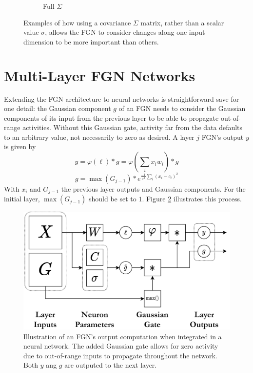 \documentclass[12pt,oneside]{CUNY_PhD}
\begin{document}
\begin{figure}[!t]
\begin{subfigure}[t]{0.49\textwidth}
        \caption*{Full $\Sigma$}
    \end{subfigure}
    \caption{Examples of how using a covariance $\Sigma$ matrix, rather than a scalar value $\sigma$, allows the FGN to consider changes along one input dimension to be more important than others.}
    \label{fig:covars}
\end{figure}

\section{Multi-Layer FGN Networks}
Extending the FGN architecture to neural networks is straightforward save for one detail: the Gaussian component $g$ of an FGN needs to consider the Gaussian components of its input from the previous layer to be able to propagate out-of-range activities. Without this Gaussian gate, activity far from the data defaults to an arbitrary value, not necessarily to zero as desired. A layer $j$ FGN's output $y$ is given by
\[y =  \varphi(\ell)*g = \varphi(\sum_i x_{i} w_{i}) * g\]
\[g = \max(G_{j-1}) * e^{\frac{-1}{\sigma^2}\sum_{i}(x_i-c_i)^2}\]
With $x_{i}$ and $G_{j-1}$ the previous layer outputs and Gaussian components. For the initial layer, $\max(G_{j-1})$ should be set to $1$. Figure \ref{fig:fgn-layer} illustrates this process.
\begin{figure}[!t]
    \centering
        \includegraphics[width=\textwidth]{images/multi-layer-fgn/FGN-Network.png}
    \caption{Illustration of an FGN's output computation when integrated in a neural network. The added Gaussian gate allows for zero activity due to out-of-range inputs to propagate throughout the network. Both $y$ ang $g$ are outputed to the next layer.}
    \label{fig:fgn-layer}
\end{figure}
\end{document}
